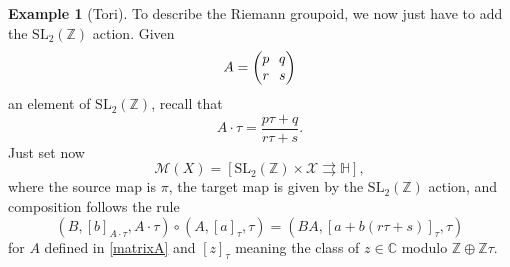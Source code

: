 \documentclass[10pt]{amsart}
\let\mathcal\mathscr
\newcommand{\SL}{\mathrm{SL}}
\theoremstyle{plain}
\theoremstyle{definition}
\newtheorem{example}[theorem]{Example}
\theoremstyle{remark}
\numberwithin{equation}{section}
\newcommand{\CC}{{\mathbb{C}}}
\begin{document}
\begin{example}[Tori]
To describe the Riemann groupoid, we now just have to add the $\SL_2(\mathbb Z)$ action. Given%
\begin{equation}
\label{matrixA}\arraycolsep3.5pt
A=\begin{pmatrix}
p &q\cr
r &s
\end{pmatrix}
\end{equation}
an element of $\SL_2(\mathbb Z)$, recall that
\begin{equation}
\label{sl2action}
A\cdot \tau=\dfrac{p\tau+q}{r\tau+s}.
\end{equation}
Just set now
\begin{equation}
\label{toriMgroupoid}
\mathcal M(X)=\left[\SL_2(\mathbb Z)\times\mathcal X\rightrightarrows \mathbb H\right ],
\end{equation}
where the source map is $\pi$, the target map is given by the $\SL_2(\mathbb Z)$ action, and composition follows the rule
\begin{equation}
\label{comptori}
(B,[b]_{A\cdot \tau},A\cdot \tau)\circ (A,[a]_\tau,\tau) =(BA,[a+b(r\tau+s)]_\tau, \tau)
\end{equation}
for $A$ defined in \eqref{matrixA} and $[z]_\tau$ meaning the class of $z\in\CC$ modulo $\mathbb Z\oplus\mathbb Z\tau$.


\end{example}
\end{document}
